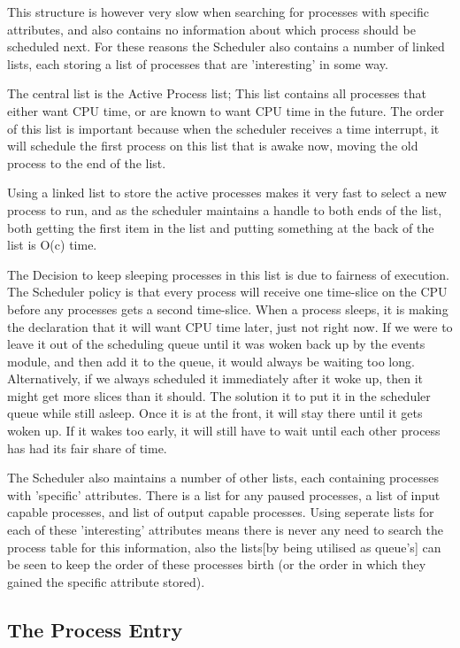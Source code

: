 \documentclass[a4paper]{report}
\begin{document}
This structure is however very slow when searching for processes with specific attributes, and also contains no information about which process should be scheduled next. For these reasons the Scheduler also contains a number of linked lists, each storing a list of processes that are 'interesting' in some way.

The central list is the Active Process list; This list contains all processes that either want CPU time, or are known to want CPU time in the future. The order of this list is important because when the scheduler receives a time interrupt, it will schedule the first process on this list that is awake now, moving the old process to the end of the list.

Using a linked list to store the active processes makes it very fast to select a new process to run, and as the scheduler maintains a handle to both ends of the list, both getting the first item in the list and putting something at the back of the list is O(c) time.

The Decision to keep sleeping processes in this list is due to fairness of execution. The Scheduler policy is that every process will receive one time-slice on the CPU before any processes gets a second time-slice. When a process sleeps, it is making the declaration that it will want CPU time later, just not right now. If we were to leave it out of the scheduling queue until it was woken back up by the events module, and then add it to the queue, it would always be waiting too long. Alternatively, if we always scheduled it immediately after it woke up, then it might get more slices than it should. The solution it to put it in the scheduler queue while still asleep. Once it is at the front, it will stay there until it gets woken up. If it wakes too early, it will still have to wait until each other process has had its fair share of time.

The Scheduler also maintains a number of other lists, each containing processes with 'specific' attributes. There is a list for any paused processes, a list of input capable processes, and list of output capable processes. Using seperate lists for each of these 'interesting' attributes means there is never any need to search the process table for this information, also the lists[by being utilised as queue's] can be seen to keep the order of these processes birth (or the order in which they gained the specific attribute stored).

\subsection{The Process Entry}
\end{document}

